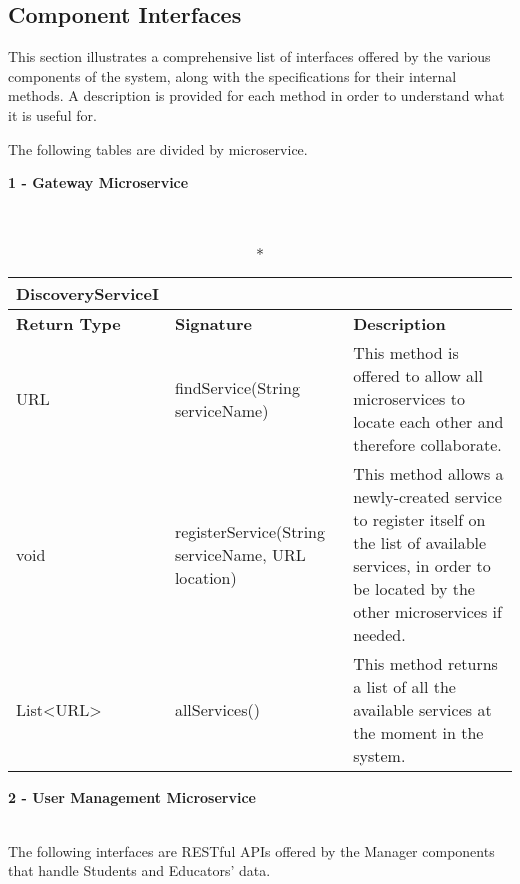 \subsection{Component Interfaces}
This section illustrates a comprehensive list of interfaces offered by the various components of the \app system, along with the specifications for their internal methods. A description is provided for each method in order to understand what it is useful for.

The following tables are divided by microservice.

\renewcommand{\arraystretch}{2.3}
\setlength{\tabcolsep}{0.7cm}

\vspace{0.5cm}


\begin{large}\textbf{1 - Gateway Microservice}\end{large}\\
\begin{longtable}{|p{2.5cm} p{6.5cm} p{4.5cm}|}
\caption*{DiscoveryServiceI}\\ 

\hline
\textbf{Return Type} & \textbf{Signature} & \textbf{Description}\\
\hline \endhead

URL & findService(String serviceName) & This method is offered to allow all microservices to locate each other and therefore collaborate.\\

void & registerService(String serviceName, URL location) & This method allows a newly-created service to register itself on the list of available services, in order to be located by the other microservices if needed.\\

 List\textless URL\textgreater & allServices() & This method returns a list of all the available services at the moment in the system.\\
 \hline

\end{longtable}


\pagebreak



\begin{large}{\textbf{2 - User Management Microservice}}\end{large}\\
The following interfaces are RESTful APIs offered by the Manager components that handle Students and Educators' data.

